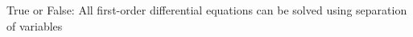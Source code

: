 \documentclass[preview]{standalone}
\begin{document}
\begin{center}
True or False: All first-order differential equations can be solved using separation of variables
\end{center}
\end{document}
